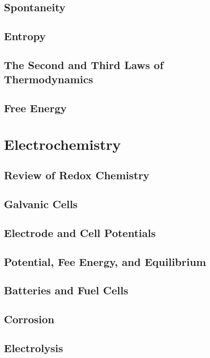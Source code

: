 \documentclass[12pt, openany, letterpaper]{memoir}
\begin{document}
\section{Spontaneity}

\section{Entropy}

\section{The Second and Third Laws of Thermodynamics}

\section{Free Energy}

\chapter{Electrochemistry}

\section{Review of Redox Chemistry}

\section{Galvanic Cells}

\section{Electrode and Cell Potentials}

\section{Potential, Fee Energy, and Equilibrium}

\section{Batteries and Fuel Cells}

\section{Corrosion}

\section{Electrolysis}
\end{document}
